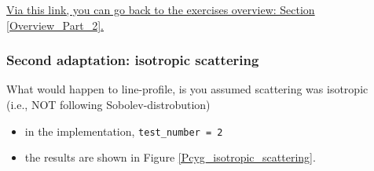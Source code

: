 \documentclass[../main/main.tex]{subfiles}
\begin{document}
\noindent{}
  
\vspace{1cm}
\underline{Via this link, you can go back to the exercises overview: Section \ref{Overview_Part_2}.}


\newpage
\subsubsection{Second adaptation: isotropic scattering}
\label{isotropic_scattering}
What would happen to line-profile, is you assumed scattering
was isotropic 
\\(i.e., NOT following Sobolev-distrobution)

\begin{itemize}
\item in the implementation, \texttt{test\_number = 2}
\item the results are shown in Figure \ref{Pcyg_isotropic_scattering}.
\end{itemize}
\end{document}
